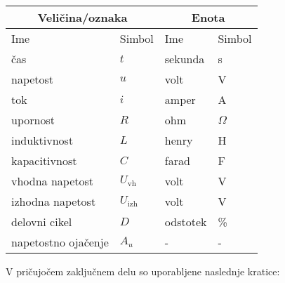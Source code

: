 \documentclass[a4paper,twoside,openright,12pt,slovene]{book}
\begin{document}
\begin{table}[H]
    \centering
    \label{tab:seznam-simbolov}
    \begin{tabular}{llll}
        \hline
        \multicolumn{2}{c}{\textbf{Veličina/oznaka}} & \multicolumn{2}{c}{\textbf{Enota}} \\ \hline
        Ime                         & Simbol         & Ime              & Simbol          \\ \hline
        čas                         & $t$            & sekunda          & s               \\ \hline
        napetost                    & $u$            & volt             & V               \\ \hline
        tok                         & $i$            & amper            & A               \\ \hline
        upornost                    & $R$            & ohm              & $\Omega$        \\ \hline
        induktivnost                & $L$            & henry            & H               \\ \hline
        kapacitivnost               & $C$            & farad            & F               \\ \hline
        vhodna napetost             & $U_\mathrm{vh}$       & volt             & V               \\ \hline
        izhodna napetost            & $U_\mathrm{izh}$      & volt             & V               \\ \hline
        delovni cikel               & $D$            & odstotek         & \%              \\ \hline
        napetostno ojačenje         & $A_u$          & -                & -               \\ \hline
    \end{tabular}
\end{table}

\seznamkratic
V pričujočem zaključnem delu so uporabljene naslednje kratice:
\end{document}
